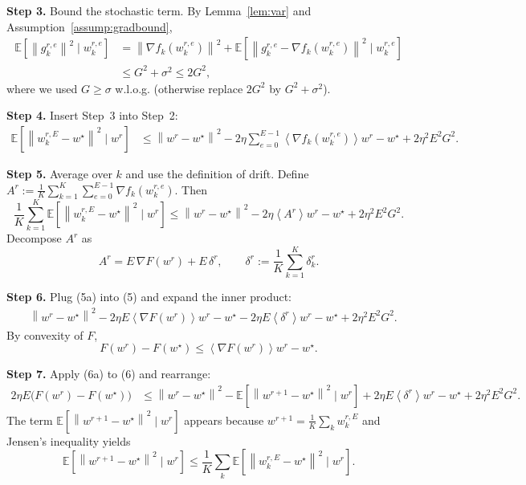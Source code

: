 \documentclass[11pt]{article}
\newcommand{\E}{\mathbb{E}}
\newcommand{\norm}[1]{\left\|#1\right\|}
\newcommand{\inner}[1]{\left\langle#1\right\rangle}
\begin{document}
\noindent\textbf{Step 3.}  Bound the stochastic term. By Lemma~\ref{lem:var} and Assumption~\ref{assump:gradbound},
\begin{align}
\E\!\left[\norm{g_{k}^{r,e}}^{2}\mid w_{k}^{r,e}\right]
&= \norm{\nabla f_k(w_{k}^{r,e})}^{2}+ \E\!\left[\norm{g_{k}^{r,e}-\nabla f_k(w_{k}^{r,e})}^{2}\mid w_{k}^{r,e}\right]\nonumber\\
&\le G^{2}+\sigma^{2}\le 2G^{2},
\tag{Step 3}
\end{align}
where we used $G\ge\sigma$ w.l.o.g. (otherwise replace $2G^{2}$ by $G^{2}+\sigma^{2}$).

\noindent\textbf{Step 4.}  Insert Step~3 into Step~2:
\begin{align}
\E\!\left[\norm{w_{k}^{r,E}-w^{\star}}^{2}\mid w^{r}\right]
&\le \norm{w^{r}-w^{\star}}^{2}
   -2\eta\sum_{e=0}^{E-1}\inner{\nabla f_k(w_{k}^{r,e})}{w^{r}-w^{\star}}
   + 2\eta^{2}E^{2}G^{2}.
\tag{Step 4}
\end{align}

\noindent\textbf{Step 5.}  Average over $k$ and use the definition of drift.  
Define $A^{r}:=\frac{1}{K}\sum_{k=1}^{K}\sum_{e=0}^{E-1}\nabla f_k(w_{k}^{r,e})$. Then
\[
\frac{1}{K}\sum_{k=1}^{K}\E\!\left[\norm{w_{k}^{r,E}-w^{\star}}^{2}\mid w^{r}\right]
\le \norm{w^{r}-w^{\star}}^{2}
   -2\eta\inner{A^{r}}{w^{r}-w^{\star}}
   + 2\eta^{2}E^{2}G^{2}.
\tag{Step 5}
\]
Decompose $A^{r}$ as
\[
A^{r}=E\,\nabla F(w^{r})+E\,\delta^{r},
\qquad \delta^{r}:=\frac{1}{K}\sum_{k=1}^{K}\delta_{k}^{r}.
\tag{Step 5a}
\]

\noindent\textbf{Step 6.}  Plug (5a) into (5) and expand the inner product:
\begin{align}
&\norm{w^{r}-w^{\star}}^{2}
   -2\eta E\inner{\nabla F(w^{r})}{w^{r}-w^{\star}}
   -2\eta E\inner{\delta^{r}}{w^{r}-w^{\star}}
   +2\eta^{2}E^{2}G^{2}.
\tag{Step 6}
\end{align}
By convexity of $F$,
\[
F(w^{r})-F(w^{\star})\le\inner{\nabla F(w^{r})}{w^{r}-w^{\star}}.
\tag{Step 6a}
\]

\noindent\textbf{Step 7.}  Apply (6a) to (6) and rearrange:
\begin{align}
2\eta E\bigl(F(w^{r})-F(w^{\star})\bigr)
&\le \norm{w^{r}-w^{\star}}^{2}
   -\E\!\left[\norm{w^{r+1}-w^{\star}}^{2}\mid w^{r}\right]
   +2\eta E\inner{\delta^{r}}{w^{r}-w^{\star}}
   +2\eta^{2}E^{2}G^{2}.
\tag{Step 7}
\end{align}
The term $\E[\norm{w^{r+1}-w^{\star}}^{2}\mid w^{r}]$ appears because $w^{r+1}= \frac{1}{K}\sum_{k} w_{k}^{r,E}$ and Jensen’s inequality yields
\[
\E\!\left[\norm{w^{r+1}-w^{\star}}^{2}\mid w^{r}\right]\le \frac{1}{K}\sum_{k}\E\!\left[\norm{w_{k}^{r,E}-w^{\star}}^{2}\mid w^{r}\right].
\tag{Step 7a}
\]
\end{document}
